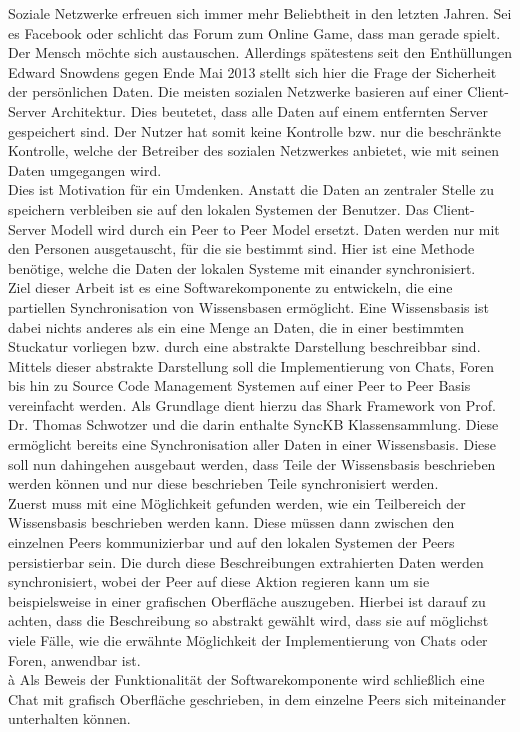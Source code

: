 \documentclass[a4paper]{article}
\begin{document}
	Soziale Netzwerke erfreuen sich immer mehr Beliebtheit in den letzten Jahren. 
	Sei es Facebook oder schlicht das Forum zum Online Game, dass man gerade
	spielt. Der Mensch möchte sich austauschen. Allerdings spätestens seit den
	Enthüllungen Edward Snowdens gegen Ende Mai 2013 stellt sich hier die Frage
	der Sicherheit der persönlichen Daten. Die meisten sozialen Netzwerke basieren
	auf einer Client-Server Architektur. Dies beutetet, dass alle Daten auf einem
	entfernten Server gespeichert sind. Der Nutzer hat somit keine Kontrolle bzw.
	nur die beschränkte Kontrolle, welche der Betreiber des sozialen Netzwerkes
	anbietet, wie mit seinen Daten umgegangen wird. \\
	
	Dies ist Motivation für ein Umdenken. Anstatt die Daten an zentraler Stelle
	zu speichern verbleiben sie auf den lokalen Systemen der Benutzer. Das
	Client-Server Modell wird durch ein Peer to Peer Model ersetzt. Daten
	werden nur mit den Personen ausgetauscht, für die sie bestimmt sind.
	Hier ist eine Methode benötige, welche die Daten der lokalen Systeme
	mit einander synchronisiert. \\

	Ziel dieser Arbeit ist es eine Softwarekomponente zu entwickeln, die eine 
	partiellen Synchronisation von Wissensbasen ermöglicht. Eine Wissensbasis
	ist dabei nichts anderes als ein eine Menge an Daten, die in einer
	bestimmten Stuckatur vorliegen bzw. durch eine abstrakte Darstellung
	beschreibbar sind. Mittels dieser abstrakte Darstellung soll die 
	Implementierung von Chats, Foren bis hin zu Source Code Management Systemen
	auf einer Peer to Peer Basis vereinfacht werden.
	Als Grundlage dient hierzu das Shark Framework \cite{SharkFW} von Prof.
	Dr.	Thomas Schwotzer und die darin enthalte SyncKB Klassensammlung. Diese
	ermöglicht bereits eine Synchronisation aller Daten in einer Wissensbasis.
	Diese soll nun dahingehen ausgebaut werden, dass Teile der Wissensbasis
	beschrieben werden können und nur diese beschrieben Teile synchronisiert 
	werden. \\
	
	Zuerst muss mit eine Möglichkeit gefunden werden, wie ein Teilbereich der
	Wissensbasis beschrieben werden kann. Diese müssen dann	zwischen den 
	einzelnen Peers kommunizierbar und auf den lokalen Systemen der Peers
	persistierbar sein. Die durch diese Beschreibungen extrahierten Daten
	werden synchronisiert, wobei der Peer auf diese Aktion regieren kann um
	sie beispielsweise in einer grafischen Oberfläche auszugeben. Hierbei
	ist darauf zu achten, dass die Beschreibung so abstrakt gewählt wird, dass 
	sie	auf möglichst viele Fälle, wie die erwähnte Möglichkeit der 
	Implementierung von Chats oder Foren, anwendbar ist. \\à
	Als Beweis der Funktionalität der Softwarekomponente wird schließlich
	eine Chat mit grafisch Oberfläche geschrieben, in dem einzelne Peers sich
	miteinander	unterhalten können.\\
	
\end{document}
